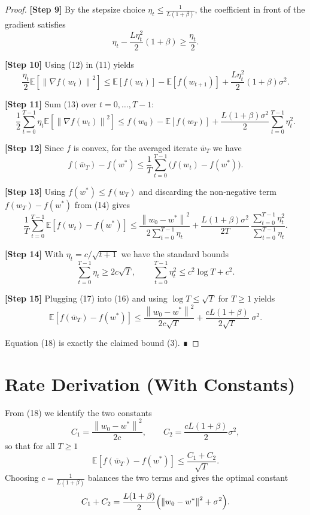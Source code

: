 \documentclass{article}
\newcommand{\E}{\mathbb{E}}
\newcommand{\norm}[1]{\left\|#1\right\|}
\begin{document}
\begin{proof}
\textbf{[Step 9]}  By the stepsize choice $\eta_t\le\frac{1}{L(1+\beta)}$, the coefficient in front of the gradient satisfies
\[
\eta_t-\frac{L\eta_t^{2}}{2}(1+\beta)\ge \frac{\eta_t}{2}.
\tag{12}
\]

\textbf{[Step 10]}  Using (12) in (11) yields
\[
\frac{\eta_t}{2}\E\!\left[\norm{\nabla f(w_t)}^{2}\right]
\le \E[f(w_t)]-\E[f(w_{t+1})]+\frac{L\eta_t^{2}}{2}(1+\beta)\sigma^{2}.
\tag{13}
\]

\textbf{[Step 11]}  Sum (13) over $t=0,\dots,T-1$:
\[
\frac{1}{2}\sum_{t=0}^{T-1}\eta_t \E\!\left[\norm{\nabla f(w_t)}^{2}\right]
\le f(w_0)-\E[f(w_T)]+\frac{L(1+\beta)\sigma^{2}}{2}\sum_{t=0}^{T-1}\eta_t^{2}.
\tag{14}
\]

\textbf{[Step 12]}  Since $f$ is convex, for the averaged iterate $\bar w_T$ we have
\[
f(\bar w_T)-f(w^{*})\le \frac{1}{T}\sum_{t=0}^{T-1}\bigl(f(w_t)-f(w^{*})\bigr).
\tag{15}
\]

\textbf{[Step 13]}  Using $f(w^{*})\le f(w_T)$ and discarding the non‑negative term $f(w_T)-f(w^{*})$ from (14) gives
\[
\frac{1}{T}\sum_{t=0}^{T-1}\E\!\left[f(w_t)-f(w^{*})\right]
\le \frac{ \norm{w_0-w^{*}}^{2}}{2\sum_{t=0}^{T-1}\eta_t}
    +\frac{L(1+\beta)\sigma^{2}}{2T}\,\frac{\sum_{t=0}^{T-1}\eta_t^{2}}{\sum_{t=0}^{T-1}\eta_t}.
\tag{16}
\]

\textbf{[Step 14]}  With $\eta_t=c/\sqrt{t+1}$ we have the standard bounds
\[
\sum_{t=0}^{T-1}\eta_t \ge 2c\sqrt{T},\qquad
\sum_{t=0}^{T-1}\eta_t^{2}\le c^{2}\log T + c^{2}.
\tag{17}
\]

\textbf{[Step 15]}  Plugging (17) into (16) and using $\log T\le \sqrt{T}$ for $T\ge 1$ yields
\[
\E\!\left[f(\bar w_T)-f(w^{*})\right]
\le \frac{\norm{w_0-w^{*}}^{2}}{2c\sqrt{T}}
   +\frac{cL(1+\beta)}{2\sqrt{T}}\;\sigma^{2}.
\tag{18}
\]

Equation (18) is exactly the claimed bound (3).  ∎
\end{proof}

\section*{Rate Derivation (With Constants)}
From (18) we identify the two constants
\[
C_{1}= \frac{\norm{w_0-w^{*}}^{2}}{2c},\qquad
C_{2}= \frac{cL(1+\beta)}{2}\sigma^{2},
\]
so that for all $T\ge1$
\[
\E\!\left[f(\bar w_T)-f(w^{*})\right]\le \frac{C_{1}+C_{2}}{\sqrt{T}}.
\]
Choosing $c=\frac{1}{L(1+\beta)}$ balances the two terms and gives the optimal constant
\[
C_{1}+C_{2}= \frac{L(1+\beta)}{2}\Bigl(\norm{w_0-w^{*}}^{2}+ \sigma^{2}\Bigr).
\]
\end{document}
